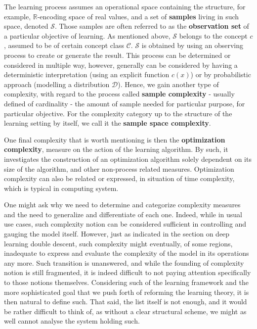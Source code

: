 The learning process assumes an operational space containing the structure, for example, $\mathbb{R}$-encoding space of real values, and a set of \textbf{samples} living in such space, denoted $\mathcal{S}$. Those samples are often referred to as the \textbf{observation set} of a particular objective of learning. As mentioned above, $\mathcal{S}$ belongs to the concept $c$, assumed to be of certain concept class $\mathcal{C}$. $\mathcal{S}$ is obtained by using an observing process to create or generate the result. This process can be determined or considered in multiple way, however, generally can be considered by having a deterministic interpretation (using an explicit function $c(x)$) or by probabilistic approach (modelling a distribution $\mathcal{D}$). Hence, we gain another type of complexity, with regard to the process called \textbf{sample complexity} - usually defined of cardinality - the amount of sample needed for particular purpose, for particular objective. For the complexity category up to the structure of the learning setting by itself, we call it the \textbf{sample space complexity}. 

One final complexity that is worth mentioning is then the \textbf{optimization complexity}, measure on the action of the learning algorithm. By such, it investigates the construction of an optimization algorithm solely dependent on its size of the algorithm, and other non-process related measures. Optimization complexity can also be related or expressed, in situation of time complexity, which is typical in computing system. 

One might ask why we need to determine and categorize complexity measures and the need to generalize and differentiate of each one. Indeed, while in usual use cases, such complexity notion can be considered sufficient in controlling and gauging the model itself. However, just as \cite{James2021} indicated in the section on deep learning double descent, such complexity might eventually, of some regions, inadequate to express and evaluate the complexity of the model in its operations any more. Such transition is unanswered, and while the founding of complexity notion is still fragmented, it is indeed difficult to not paying attention specifically to those notions themselves. Considering such of the learning framework and the more sophisticated goal that we push forth of reforming the learning theory, it is then natural to define such. That said, the list itself is not enough, and it would be rather difficult to think of, as without a clear structural scheme, we might as well cannot analyse the system holding such. 

